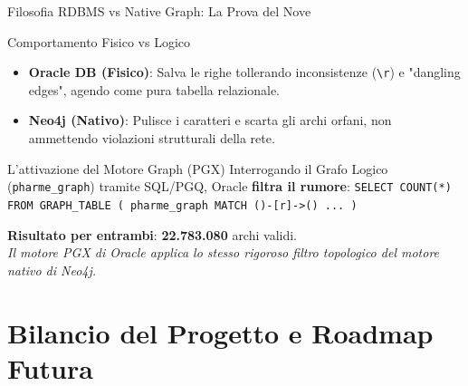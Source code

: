 \documentclass[aspectratio=169]{beamer}
\begin{document}
\begin{frame}{Filosofia RDBMS vs Native Graph: La Prova del Nove}
    \begin{block}{\faCogs \hspace{0.2cm} Comportamento Fisico vs Logico}
        \small
        \begin{itemize}
            \item \textbf{Oracle DB (Fisico)}: Salva le righe tollerando inconsistenze (\texttt{\textbackslash r}) e "dangling edges", agendo come pura tabella relazionale.
            \item \textbf{Neo4j (Nativo)}: Pulisce i caratteri e scarta gli archi orfani, non ammettendo violazioni strutturali della rete.
        \end{itemize}
    \end{block}
    
    \vspace{0.2cm}
    
    \begin{exampleblock}{\faCheckDouble \hspace{0.2cm} L'attivazione del Motore Graph (PGX)}
        \small
        Interrogando il Grafo Logico (\texttt{pharme\_graph}) tramite SQL/PGQ, Oracle \textbf{filtra il rumore}:
        \vspace{0.1cm}
        \centering
        \texttt{\scriptsize SELECT COUNT(*) FROM GRAPH\_TABLE ( pharme\_graph MATCH ()-[r]->() ... )}
        \vspace{0.1cm}
        
        \textbf{Risultato per entrambi}: \textbf{22.783.080} archi validi. \\
        \textit{Il motore PGX di Oracle applica lo stesso rigoroso filtro topologico del motore nativo di Neo4j.}
    \end{exampleblock}
\end{frame}

\section{Bilancio del Progetto e Roadmap Futura}
\end{document}
